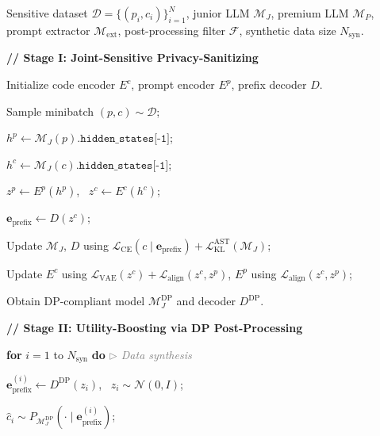 \documentclass{article}
\renewcommand{\algorithmicrequire}{\textbf{Input:}}
\newcommand{\Input}[1]{\item[\algorithmicrequire] #1}
\theoremstyle{plain}
\theoremstyle{definition}
\theoremstyle{remark}
\def \toolname{PrivCode++}
\begin{document}
\begin{algorithm}[t]
\caption{Workflow of \toolname}
\begin{algorithmic}[1]
\label{alg:privcodepp_workflow}
\Input{
Sensitive dataset $\mathcal{D}=\{(p_i,c_i)\}_{i=1}^N$, 
junior LLM $\mathcal{M}_J$, 
premium LLM $\mathcal{M}_P$,
prompt extractor $\mathcal{M}_{\text{ext}}$,
post-processing filter $\mathcal{F}$,
synthetic data size $N_{\text{syn}}$.
}


\vspace{0.4em}
\item[] \hspace{-1.3em} {\color{gray}\textbf{// Stage I: Joint-Sensitive Privacy-Sanitizing}}

\STATE Initialize code encoder $E^c$, prompt encoder $E^p$, prefix decoder $D$.

    \STATE Sample minibatch $(p,c) \sim \mathcal{D}$;
    
    \STATE $h^p \gets \mathcal{M}_J(p).\texttt{hidden\_states[-1]}$;

    \STATE $h^c \gets \mathcal{M}_J(c).\texttt{hidden\_states[-1]}$;

    \STATE $z^p \gets E^p(h^p)$, \ $z^c \gets E^c(h^c)$;
    
    \STATE $\mathbf{e}_{\text{prefix}} \gets D(z^c)$;
    
    \STATE Update $\mathcal{M}_J$, $D$ using $\mathcal{L}_{\text{CE}}(c \mid \mathbf{e}_{\text{prefix}}) + \mathcal{L}_{\text{KL}}^{\text{AST}}(\mathcal{M}_J)$;
    
    \STATE Update $E^c$ using $\mathcal{L}_{\text{VAE}}(z^c) + \mathcal{L}_{\text{align}}(z^c, z^p)$, 
    $E^p$ using $\mathcal{L}_{\text{align}}(z^c, z^p)$;
\ENDFOR

\STATE Obtain DP-compliant model $\mathcal{M}_J^{\text{DP}}$ and decoder $D^{\text{DP}}$.

\vspace{0.4em}
\item[] \hspace{-1.3em} {\color{gray}\textbf{// Stage II: Utility-Boosting via DP Post-Processing}}

\STATE \textbf{for} $i = 1$ to $N_{\text{syn}}$ \textbf{do}
\hfill {\small\textcolor{gray}{\textit{$\triangleright$ Data synthesis}}}

\STATE \quad $\mathbf{e}_{\text{prefix}}^{(i)} \gets D^{\text{DP}}(z_i)$, \ $z_i \sim \mathcal{N}(0,I)$;

\STATE \quad $\hat{c}_i \sim P_{\mathcal{M}_J^{\text{DP}}}(\cdot \mid \mathbf{e}_{\text{prefix}}^{(i)})$;


\end{algorithmic}
\end{algorithm}
\end{document}
